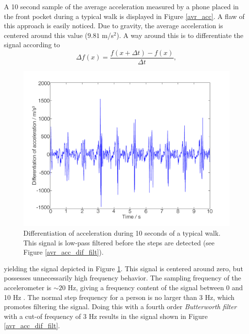 \documentclass{LTHthesis}
\begin{document}
A 10 second sample of the average acceleration measured by a phone placed in the front pocket during a typical walk is displayed in Figure \ref{avr_acc}. A flaw of this approach is easily noticed. Due to gravity, the average acceleration is centered around this value ($9.81$ m/s$^2$). A way around this is to differentiate the signal according to 
%
\begin{equation}
\Delta f(x) = \frac{f(x+\Delta t) - f(x) }{\Delta t},
\end{equation} 
%
\begin{figure}[!hbt]

\includegraphics[width=1\textwidth ]{images/kinematic/avr_acc_dif}
\caption{Differentiation of acceleration during 10 seconds of a typical walk. This signal is low-pass filtered before the steps are detected (see Figure \ref{avr_acc_dif_filt}).}\label{avr_acc_dif}
\end{figure}
%
yielding the signal depicted in Figure \ref{avr_acc_dif}. This signal is centered around zero, but possesses unnecessarily high frequency behavior. The sampling frequency of the accelerometer is $\sim 20$ Hz, giving a frequency content of the signal between 0 and 10 Hz \cite{pro07}. The normal step frequency for a person is no larger than 3 Hz, which promotes filtering the signal. Doing this with a fourth order \emph{Butterworth filter} with a cut-of frequency of 3 Hz results in the signal shown in Figure \ref{avr_acc_dif_filt}.
%
\end{document}
